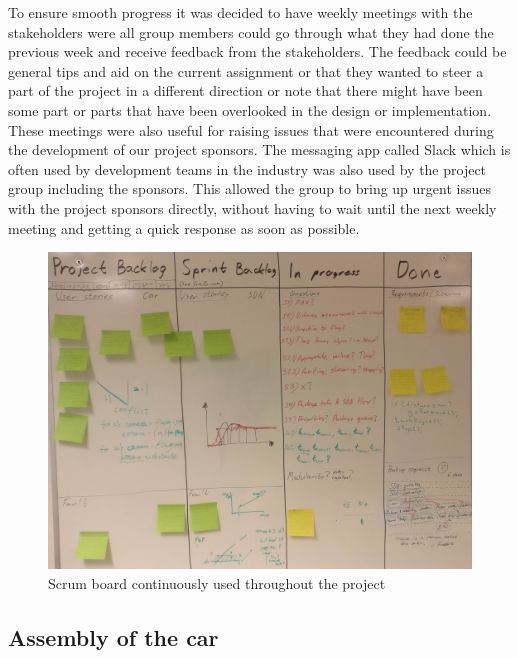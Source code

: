 \documentclass[11pt, titlepage]{article} %
\begin{document}
To ensure smooth progress it was decided to have weekly meetings with the stakeholders were all group members could go through what they had done the previous week and receive feedback from the stakeholders. The feedback could be general tips and aid on the current assignment or that they wanted to steer a part of the project in a different direction or note that there might have been some part or parts that have been overlooked in the design or implementation. These meetings were also useful for raising issues that were encountered during the development of our project sponsors. The messaging app called Slack which is often used by development teams in the industry was also used by the project group including the sponsors. This allowed the group to bring up urgent issues with the project sponsors directly, without having to wait until the next weekly meeting and getting a quick response as soon as possible.

\begin{figure}[]
	\centering
   	\includegraphics[scale=0.5]{scrum-board.jpg}
   	\caption{Scrum board continuously used throughout the project}
    \label{fig:scrum-board}
\end{figure}



\subsection{Assembly of the car}
\end{document}
